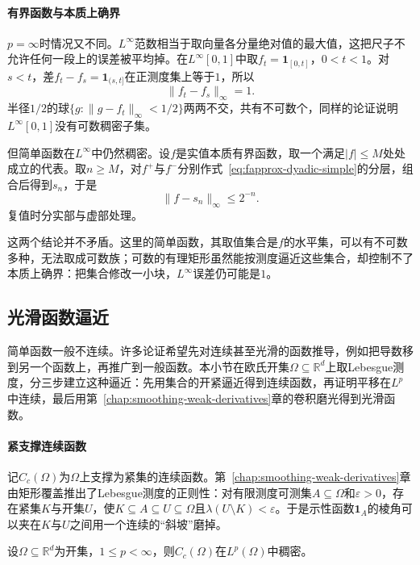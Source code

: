 \paragraph{有界函数与本质上确界}
$p=\infty$时情况又不同。$L^\infty$范数相当于取向量各分量绝对值的最大值，这把尺子不允许任何一段上的误差被平均掉。在$L^\infty[0,1]$中取$f_t=\mathbf 1_{[0,t]}$，$0<t<1$。对$s<t$，差$f_t-f_s=\mathbf 1_{(s,t]}$在正测度集上等于$1$，所以
\[
 \lVert f_t-f_s\rVert_\infty=1 .
\]
半径$1/2$的球$\{g:\lVert g-f_t\rVert_\infty<1/2\}$两两不交，共有不可数个，同样的论证说明$L^\infty[0,1]$没有可数稠密子集。

但简单函数在$L^\infty$中仍然稠密。设$f$是实值本质有界函数，取一个满足$\lvert f\rvert\leq M$处处成立的代表。取$n\geq M$，对$f^+$与$f^-$分别作式~\eqref{eq:fapprox-dyadic-simple}的分层，组合后得到$s_n$，于是
\[
 \lVert f-s_n\rVert_\infty\leq2^{-n}.
\]
复值时分实部与虚部处理。

这两个结论并不矛盾。这里的简单函数，其取值集合是$f$的水平集，可以有不可数多种，无法取成可数族；可数的有理矩形虽然能按测度逼近这些集合，却控制不了本质上确界：把集合修改一小块，$L^\infty$误差仍可能是$1$。

\subsection{光滑函数逼近}
\label{sec:fapprox-smooth}

简单函数一般不连续。许多论证希望先对连续甚至光滑的函数推导，例如把导数移到另一个函数上，再推广到一般函数。本小节在欧氏开集$\Omega\subseteq\mathbb R^d$上取Lebesgue测度，分三步建立这种逼近：先用集合的开紧逼近得到连续函数，再证明平移在$L^p$中连续，最后用第~\ref{chap:smoothing-weak-derivatives}章的卷积磨光得到光滑函数。

\paragraph{紧支撑连续函数}
记$C_c(\Omega)$为$\Omega$上支撑为紧集的连续函数。第~\ref{chap:smoothing-weak-derivatives}章由矩形覆盖推出了Lebesgue测度的正则性：对有限测度可测集$A\subseteq\Omega$和$\varepsilon>0$，存在紧集$K$与开集$U$，使$K\subseteq A\subseteq U\subseteq\Omega$且$\lambda(U\setminus K)<\varepsilon$。于是示性函数$\mathbf 1_A$的棱角可以夹在$K$与$U$之间用一个连续的“斜坡”磨掉。

\begin{theorem}[紧支撑连续函数逼近$L^p$函数]
\label{thm:fapprox-cc-dense}
设$\Omega\subseteq\mathbb R^d$为开集，$1\leq p<\infty$，则$C_c(\Omega)$在$L^p(\Omega)$中稠密。
\end{theorem}

